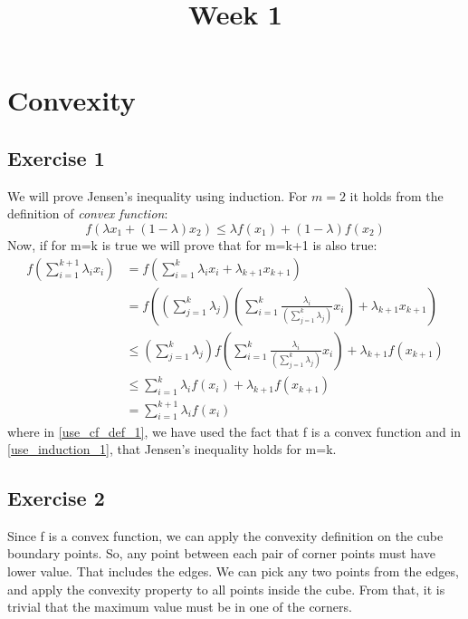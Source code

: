 \documentclass[twoside,11pt]{article}
\begin{document}
	
\title{Week 1}
\date{\vspace{-5ex}}
\maketitle

\section{Convexity}

\subsection{Exercise 1}

We will prove Jensen's inequality using induction.
For $m=2$ it holds from the definition of \emph{convex function}:
\begin{equation*}
f(\lambda x_1 + (1 - \lambda) x_2) \leq \lambda f(x_1) + (1 - \lambda) f(x_2)
\end{equation*}
Now, if for m=k is true we will prove that for m=k+1 is also true:
\begin{align}
	f\left(\sum_{i=1}^{k+1} \lambda_{i} x_{i}\right) & = f\left(\sum_{i=1}^{k} \lambda_{i} x_{i} + \lambda_{k+1}x_{k+1}\right) \\
	& = f\left(\left(\sum_{j=1}^{k} \lambda_j \right) \left(\sum_{i=1}^{k} \frac{\lambda_{i}}{\left(\sum_{j=1}^{k} \lambda_j \right)} x_{i} \right) + \lambda_{k+1}x_{k+1}\right) \\
	& \leq \left(\sum_{j=1}^{k} \lambda_j \right) f\left(\sum_{i=1}^{k} \frac{\lambda_{i}}{\left(\sum_{j=1}^{k} \lambda_j \right)} x_{i} \right) + \lambda_{k+1}f(x_{k+1}) \label{use_cf_def_1} \\ 
	& \leq \sum_{i=1}^{k} \lambda_{i} f(x_{i}) + \lambda_{k+1}f(x_{k+1}) \label{use_induction_1} \\ 
	& = \sum_{i=1}^{k+1} \lambda_{i} f(x_{i})
\end{align}
where in \eqref{use_cf_def_1}, we have used the fact that f is a convex function and in \eqref{use_induction_1}, that Jensen's inequality holds for m=k.

\subsection{Exercise 2}

Since f is a convex function, we can apply the convexity definition on the cube boundary points. So, any point between each pair of corner points must have lower value. That includes the edges. We can pick any two points from the edges, and apply the convexity property to all points inside the cube. From that, it is trivial that the maximum value must be in one of the corners.
\end{document}
